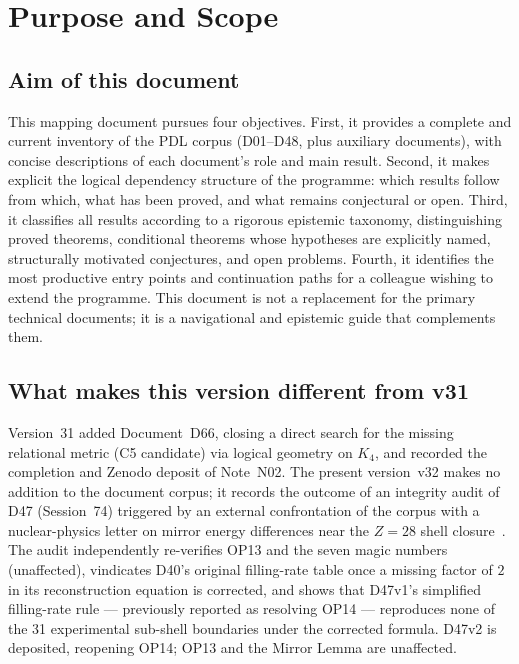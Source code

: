 \documentclass[11pt,a4paper]{article}
\theoremstyle{plain}
\theoremstyle{definition}
\theoremstyle{remark}
\begin{document}
\clearpage

\tableofcontents

\clearpage

\section{Purpose and Scope}
\label{sec:purpose}

\subsection{Aim of this document}
\label{subsec:aim}
This mapping document pursues four objectives. First, it provides a complete and current inventory of the PDL corpus (D01--D48, plus auxiliary documents), with concise descriptions of each document's role and main result. Second, it makes explicit the logical dependency structure of the programme: which results follow from which, what has been proved, and what remains conjectural or open. Third, it classifies all results according to a rigorous epistemic taxonomy, distinguishing proved theorems, conditional theorems whose hypotheses are explicitly named, structurally motivated conjectures, and open problems. Fourth, it identifies the most productive entry points and continuation paths for a colleague wishing to extend the programme. This document is not a replacement for the primary technical documents; it is a navigational and epistemic guide that complements them.

\subsection{What makes this version different from v31}
\label{subsec:diffv31}
Version~31 added Document~D66, closing a direct search for the missing relational metric (C5 candidate) via logical geometry on $K_4$, and recorded the completion and Zenodo deposit of Note~N02. The present version~v32 makes no addition to the document corpus; it records the outcome of an integrity audit of D47 (Session~74) triggered by an external confrontation of the corpus with a nuclear-physics letter on mirror energy differences near the $Z=28$ shell closure~\cite{Pigliapoco2026}. The audit independently re-verifies OP13 and the seven magic numbers (unaffected), vindicates D40's original filling-rate table once a missing factor of $2$ in its reconstruction equation is corrected, and shows that D47v1's simplified filling-rate rule --- previously reported as resolving OP14 --- reproduces none of the 31 experimental sub-shell boundaries under the corrected formula. D47v2 is deposited, reopening OP14; OP13 and the Mirror Lemma are unaffected.
\end{document}
